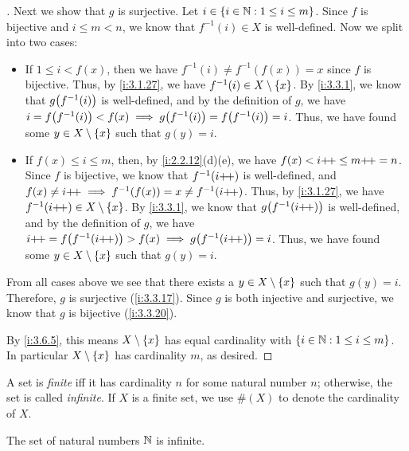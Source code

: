 \begin{proof}[]
  Next we show that \(g\) is surjective.
  Let \(i \in \left\lbrace i \in \mathbb{N} : 1 \leq i \leq m\right\rbrace\).
  Since \(f\) is bijective and \(i \leq m < n\), we know that \(f^{-1}(i) \in X\) is well-defined.
  Now we split into two cases:
  \begin{itemize}
    \item If \(1 \leq i < f(x)\), then we have \(f^{-1}(i) \neq f^{-1}(f(x)) = x\) since \(f\) is bijective.
          Thus, by \cref{i:3.1.27}, we have \(f^{-1}(i) \in X \setminus \left\lbrace x\right\rbrace\).
          By \cref{i:3.3.1}, we know that \(g\pa{f^{-1}(i)}\) is well-defined, and by the definition of \(g\), we have \(i = f\pa{f^{-1}(i)} < f(x) \implies g\pa{f^{-1}(i)} = f\pa{f^{-1}(i)} = i\).
          Thus, we have found some \(y \in X \setminus \left\lbrace x\right\rbrace\) such that \(g(y) = i\).
    \item If \(f(x) \leq i \leq m\), then, by \cref{i:2.2.12}(d)(e), we have \(f(x) < i{+}\!{+} \leq m{+}\!{+} = n\).
          Since \(f\) is bijective, we know that \(f^{-1}(i{+}\!{+})\) is well-defined, and \(f(x) \neq i{+}\!{+} \implies f^{-1}(f(x)) = x \neq f^{-1}(i{+}\!{+})\).
          Thus, by \cref{i:3.1.27}, we have \(f^{-1}(i{+}\!{+}) \in X \setminus \left\lbrace x\right\rbrace\).
          By \cref{i:3.3.1}, we know that \(g\pa{f^{-1}(i\pp)}\) is well-defined, and by the definition of \(g\), we have \(i\pp = f\pa{f^{-1}(i\pp)} > f(x) \implies g\pa{f^{-1}(i\pp)} = i\).
          Thus, we have found some \(y \in X \setminus \left\lbrace x\right\rbrace\) such that \(g(y) = i\).
  \end{itemize}
  From all cases above we see that there exists a \(y \in X \setminus \left\lbrace x\right\rbrace\) such that \(g(y) = i\).
  Therefore, \(g\) is surjective (\cref{i:3.3.17}).
  Since \(g\) is both injective and surjective, we know that \(g\) is bijective (\cref{i:3.3.20}).

  By \cref{i:3.6.5}, this means \(X \setminus \left\lbrace x\right\rbrace\) has equal cardinality with \(\left\lbrace i \in \mathbb{N} : 1 \leq i \leq m\right\rbrace\).
  In particular \(X \setminus \left\lbrace x\right\rbrace\) has cardinality \(m\), as desired.
\end{proof}

\begin{defn}\label{i:3.6.10}
  A set is \emph{finite} iff it has cardinality \(n\) for some natural number \(n\);
  otherwise, the set is called \emph{infinite}.
  If \(X\) is a finite set, we use \(\#(X)\) to denote the cardinality of \(X\).
\end{defn}

\setcounter{thm}{11}
\begin{thm}\label{i:3.6.12}
  The set of natural numbers \(\mathbb{N}\) is infinite.
\end{thm}

